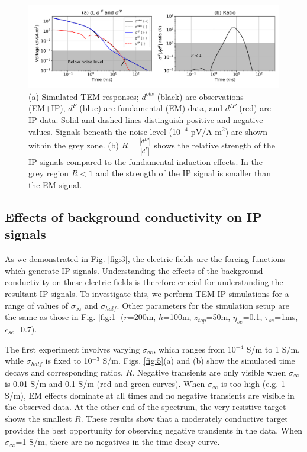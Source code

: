 \documentclass[manuscript]{geophysics}
\newcommand{\siginf}{\sigma_\infty}
\newcommand{\dip}{d^{IP}}
\begin{document}
\begin{figure}[htb]
  \centering
  \includegraphics[width=1.0\textwidth]{figures/data.png}
  \caption{(a) Simulated TEM responses; $d^{obs}$ (black) are observations (EM+IP), $d^F$ (blue) are fundamental (EM) data, and $\dip$ (red) are IP data. Solid and dashed lines distinguish positive and negative values. Signals beneath the noise level (10$^{-4}$ pV/A-m$^2$) are shown within the grey zone. (b)  $R =\frac{|\dip|}{|d^F|}$ shows the relative strength of the IP signals compared to the fundamental induction effects. In the grey region  $R<1$ and the strength of the IP signal is smaller than the EM signal.}
  \label{fig:4}
\end{figure}

\clearpage
\subsection{Effects of background conductivity on IP signals}
As we demonstrated in Fig. \ref{fig:3}, the electric fields are the forcing functions which generate IP signals. Understanding the effects of the background conductivity on these electric fields is therefore crucial for understanding the resultant IP signals. To investigate this, we perform TEM-IP simulations for a range of values of $\siginf$ and $\sigma_{half}$. Other parameters for the simulation setup are the same as those in Fig. \ref{fig:1} ($r$=200m, $h$=100m, $z_{top}$=50m, $\eta_{se}$=0.1, $\tau_{se}$=1ms, $c_{se}$=0.7).

The first experiment involves varying $\siginf$, which ranges from 10$^{-4}$ S/m to 1 S/m, while  $\sigma_{half}$ is fixed to 10$^{-3}$ S/m. Figs. \ref{fig:5}(a) and (b) show the simulated time decays and corresponding ratios, $R$. Negative transients are only visible when $\siginf$ is 0.01 S/m and  0.1 S/m (red and green curves). When $\siginf$ is too high (e.g. 1 S/m), EM effects dominate at all times and no negative transients are visible in the observed data. At the other end of the spectrum, the very resistive target shows the smallest $R$. These results show  that a moderately conductive target provides the best opportunity for observing negative transients in the data. When $\siginf$=1 S/m, there are no negatives in the time decay curve.
\end{document}
